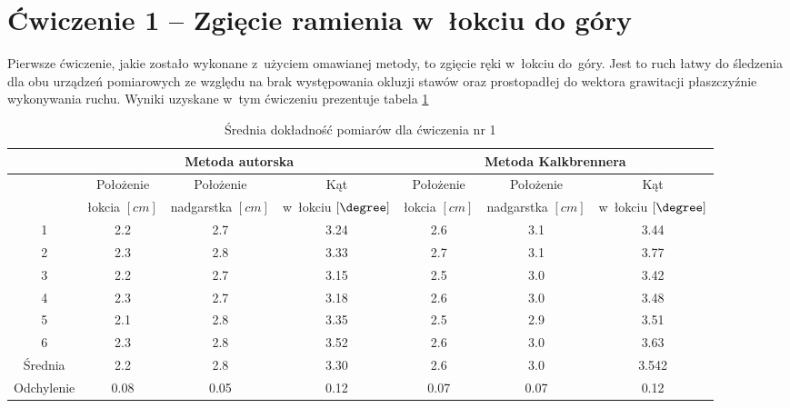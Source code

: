 \section*{Ćwiczenie 1 -- Zgięcie ramienia w~łokciu do góry}
Pierwsze ćwiczenie, jakie zostało wykonane z~użyciem omawianej metody, to zgięcie ręki w~łokciu do~góry. Jest to ruch łatwy do śledzenia dla obu urządzeń pomiarowych ze względu na brak występowania okluzji stawów oraz prostopadłej do wektora grawitacji płaszczyźnie wykonywania ruchu. Wyniki uzyskane w~tym ćwiczeniu prezentuje tabela \ref{tab:experiments:first:avg}
\begin{table}[!htp]
	\caption{Średnia dokładność pomiarów dla ćwiczenia nr 1}
	\label{tab:experiments:first:avg}
	\noindent
	\tiny
	\centering
	\begin{tabular}{|c|c|c|c|c|c|c|}
		\hline 
		& \multicolumn{3}{c|}{Metoda autorska} & \multicolumn{3}{c|}{Metoda Kalkbrennera}  \\ 
		\hline 
		           & Położenie    & Położenie       & Kąt                  & Położenie    & Położenie       & Kąt                  \\
		           & łokcia $[cm]$ & nadgarstka $[cm]$ & w~łokciu	$[\degree]$ & łokcia $[cm]$ & nadgarstka $[cm]$ & w~łokciu	$[\degree]$ \\
		\hline
		1          & 2.2            & 2.7               & 3.24                  & 2.6            & 3.1               & 3.44                  \\
		2          & 2.3            & 2.8               & 3.33                  & 2.7            & 3.1               & 3.77                  \\
		3          & 2.2            & 2.7               & 3.15                  & 2.5            & 3.0               & 3.42                  \\
		4          & 2.3            & 2.7               & 3.18                  & 2.6            & 3.0               & 3.48                  \\
		5          & 2.1            & 2.8               & 3.35                  & 2.5            & 2.9               & 3.51                  \\
		6          & 2.3            & 2.8               & 3.52                  & 2.6            & 3.0               & 3.63                  \\
		\hline
		Średnia   & 2.2            & 2.8               & 3.30                  & 2.6            & 3.0               & 3.542                 \\
		Odchylenie & 0.08           & 0.05              & 0.12                  & 0.07           & 0.07              & 0.12                  \\
		\hline
	\end{tabular} 
						
\end{table} 

